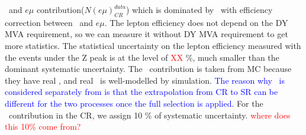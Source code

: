 \vv\ and $e\mu$ contribution($N(e\mu)_{CR}^{data}$) which is dominated by \topbkg\ with 
efficiency correction between \SF\ and $e\mu$. The lepton efficiency does not depend 
on the DY MVA requirement, so we can measure it without DY MVA requirement 
to get more statistics. The statistical uncertainty on the lepton efficiency 
measured with the events under the Z peak is at the level of \textcolor{red}{XX} \%,
much smaller than the dominant systematic uncertainty. 
The \vv\ contribution is taken from MC because they have real \met, 
and real \met\ is well-modelled by simulation.
\textcolor{blue}{The reason why \vv\ is considered separately from \dyll
is that the extrapolation from CR to SR can be different for the two 
processes once the full selection is applied.}  
For the \vv\ contribution in the CR, we assign 10 \% of systematic uncertainty.  
\textcolor{red}{where does this 10\% come from?} 

